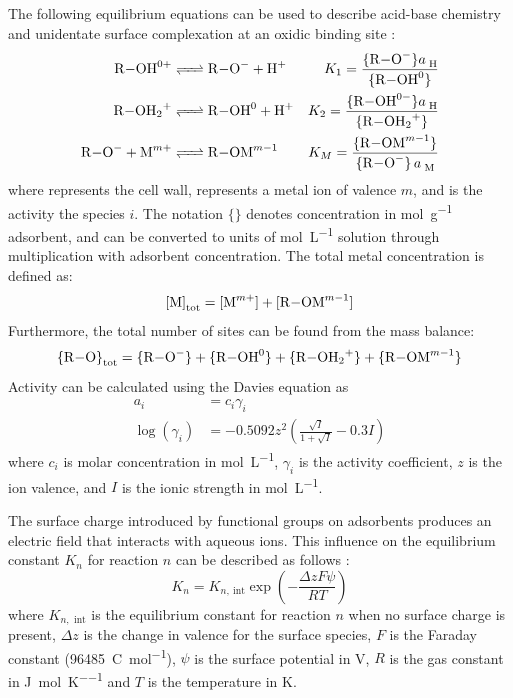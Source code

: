 The following equilibrium equations can be used to describe acid-base chemistry and unidentate surface complexation at an oxidic binding site  \parencite{Ngwenya2003,Stumm1992}: 
\begin{align}
\label{eq:deprot}
\ce{R-OH^0+ &<=> R-O^- + H+}  & K_1= \ce{\frac{\{R-O^-\}$ a $ _{H}}{\{R-OH^0\}}} \\
\label{eq:prot}
\ce{R-OH2^+ &<=> R-OH^0 + H+}  & K_2= \ce{\frac{\{R-OH^0-\}$ a $ _{H}}{\{R-OH2^+\}}} \\
\label{eq:surfcomp}
\ce{R-O^- + M^{$m$+}  &<=> R-OM^{$m-1$}}  & K_M= \ce{\frac{\{R-OM^{$m-1$}\}}{\{R-O^-\} $ a $ _M }}
\end{align}
where  represents the cell wall,  represents a metal ion of valence $ m $, and  is the activity the species $ i $. The notation $ \{\} $ denotes concentration in \si{\mol\per\gram} adsorbent, and can be converted to units of \si{\mol\per\liter} solution through multiplication with adsorbent concentration. The total metal concentration is defined as:
\begin{equation}
\label{eq:sitemassbal_met}
\ce{[M]}_\textrm{tot} = \ce{[M^{$m+$}] + [R-OM^{$m-1$}]} 
\end{equation}
Furthermore, the total number of sites can be found from the mass balance:
\begin{equation}
\label{eq:sitemassbal}
\ce{\{R-O\}}_\textrm{tot} = \ce{\{R-O^-\} + \{R-OH^0\} + \{R-OH2^+\} +\{R-OM^{$m-1$}\}} 
\end{equation}
Activity can be calculated using the Davies equation \parencite{Turner2005} as
\begin{align}
a_i &= c_i \gamma_i\\
\log\left(\gamma_i\right) &= -0.5092z^2 \left( \frac{\sqrt{I}}{1 + \sqrt{I}} - 0.3I\right)
\end{align}
where $ c_i $ is molar concentration in \si{\mole\per\liter}, $ \gamma_i $ is the activity coefficient, $ z $ is the ion valence, and  $ I $ is the ionic strength in \si{\mole\per\liter}.

The surface charge introduced by functional groups on adsorbents produces an electric field that interacts with aqueous ions. This influence on the equilibrium constant $ K_n $ for reaction $ n $ can be described as follows \parencite{Fein1997}:
\begin{equation}
K_n = K_{n,\mathrm{~int}} \exp\left(-\frac{\Delta zF\psi}{RT}\right)
\end{equation}
where $ K_{n,\textrm{~int}} $ is the equilibrium constant for reaction $ n $ when no surface charge is present, $ \Delta z $ is the change in valence for the surface species, $ F $ is the  Faraday constant (\SI{96485}{\coulomb\per\mole}), $ \psi $ is the surface potential in \si{\volt}, $ R $ is the gas constant in \si{\joule\per\mol\per\kelvin} and $ T $ is the temperature in \si{\kelvin}.

